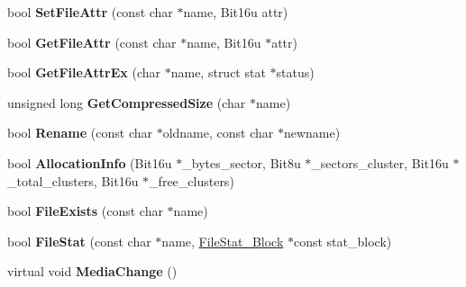 \begin{DoxyCompactItemize}
\item 
\hypertarget{classVirtual__Drive_a63c8c76dd34dcdfff947733c1bb86cbc}{bool {\bfseries Set\-File\-Attr} (const char $\ast$name, Bit16u attr)}\label{classVirtual__Drive_a63c8c76dd34dcdfff947733c1bb86cbc}

\item 
\hypertarget{classVirtual__Drive_ac5a26ae326fe4ef86c3aeeab030640db}{bool {\bfseries Get\-File\-Attr} (const char $\ast$name, Bit16u $\ast$attr)}\label{classVirtual__Drive_ac5a26ae326fe4ef86c3aeeab030640db}

\item 
\hypertarget{classVirtual__Drive_a91e224f4fec14674c025306c827de9a7}{bool {\bfseries Get\-File\-Attr\-Ex} (char $\ast$name, struct stat $\ast$status)}\label{classVirtual__Drive_a91e224f4fec14674c025306c827de9a7}

\item 
\hypertarget{classVirtual__Drive_ae0ca733d5fbf25f8c6c9b616ff621924}{unsigned long {\bfseries Get\-Compressed\-Size} (char $\ast$name)}\label{classVirtual__Drive_ae0ca733d5fbf25f8c6c9b616ff621924}

\item 
\hypertarget{classVirtual__Drive_a5bafd492b22e85790ab37c94a1dd3d6b}{bool {\bfseries Rename} (const char $\ast$oldname, const char $\ast$newname)}\label{classVirtual__Drive_a5bafd492b22e85790ab37c94a1dd3d6b}

\item 
\hypertarget{classVirtual__Drive_afc40a6c58322450b7926af869f8552b5}{bool {\bfseries Allocation\-Info} (Bit16u $\ast$\-\_\-bytes\-\_\-sector, Bit8u $\ast$\-\_\-sectors\-\_\-cluster, Bit16u $\ast$\-\_\-total\-\_\-clusters, Bit16u $\ast$\-\_\-free\-\_\-clusters)}\label{classVirtual__Drive_afc40a6c58322450b7926af869f8552b5}

\item 
\hypertarget{classVirtual__Drive_a042c9df503a6929b8be4eb5c4ccb9d34}{bool {\bfseries File\-Exists} (const char $\ast$name)}\label{classVirtual__Drive_a042c9df503a6929b8be4eb5c4ccb9d34}

\item 
\hypertarget{classVirtual__Drive_ac1b5aa7a3e96c789a357eacacdbafee9}{bool {\bfseries File\-Stat} (const char $\ast$name, \hyperlink{structFileStat__Block}{File\-Stat\-\_\-\-Block} $\ast$const stat\-\_\-block)}\label{classVirtual__Drive_ac1b5aa7a3e96c789a357eacacdbafee9}

\item 
\hypertarget{classVirtual__Drive_a60c747bf84748c41f6489a85e354ce53}{virtual void {\bfseries Media\-Change} ()}\label{classVirtual__Drive_a60c747bf84748c41f6489a85e354ce53}


\end{DoxyCompactItemize}
